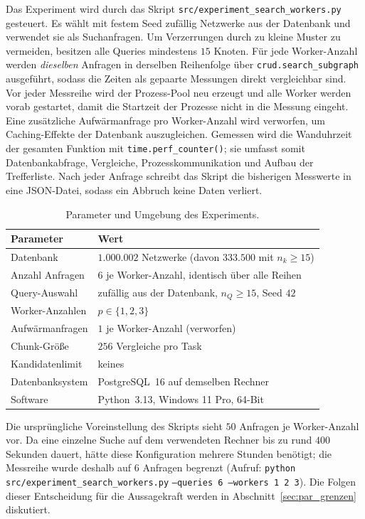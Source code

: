 \documentclass[a4paper,12pt, twoside]{report}
\theoremstyle{definition}
\begin{document}
Das Experiment wird durch das Skript \texttt{src/experiment\_search\_workers.py} gesteuert. Es wählt mit festem Seed zufällig Netzwerke aus der Datenbank und verwendet sie als Suchanfragen. Um Verzerrungen durch zu kleine Muster zu vermeiden, besitzen alle Queries mindestens $15$ Knoten. Für jede Worker-Anzahl werden \emph{dieselben} Anfragen in derselben Reihenfolge über \texttt{crud.search\_subgraph} ausgeführt, sodass die Zeiten als gepaarte Messungen direkt vergleichbar sind. Vor jeder Messreihe wird der Prozess-Pool neu erzeugt und alle Worker werden vorab gestartet, damit die Startzeit der Prozesse nicht in die Messung eingeht. Eine zusätzliche Aufwärmanfrage pro Worker-Anzahl wird verworfen, um Caching-Effekte der Datenbank auszugleichen. Gemessen wird die Wanduhrzeit der gesamten Funktion mit \texttt{time.perf\_counter()}; sie umfasst somit Datenbankabfrage, Vergleiche, Prozesskommunikation und Aufbau der Trefferliste. Nach jeder Anfrage schreibt das Skript die bisherigen Messwerte in eine JSON-Datei, sodass ein Abbruch keine Daten verliert.

\begin{table}[h]
	\centering
	\caption{Parameter und Umgebung des Experiments.}
	\label{tab:par_setup}
	\begin{tabular}{@{}ll@{}}
		\toprule
		Parameter & Wert \\
		\midrule
		Datenbank & $1.000.002$ Netzwerke (davon $333.500$ mit $n_k\ge 15$) \\
		Anzahl Anfragen & $6$ je Worker-Anzahl, identisch über alle Reihen \\
		Query-Auswahl & zufällig aus der Datenbank, $n_Q \ge 15$, Seed $42$ \\
		Worker-Anzahlen & $p\in\{1,2,3\}$ \\
		Aufwärmanfragen & $1$ je Worker-Anzahl (verworfen) \\
		Chunk-Größe & $256$ Vergleiche pro Task \\
		Kandidatenlimit & keines \\
		Datenbanksystem & PostgreSQL~16 auf demselben Rechner \\
		Software & Python~3.13, Windows 11 Pro, 64-Bit \\
		\bottomrule
	\end{tabular}
\end{table}

Die ursprüngliche Voreinstellung des Skripts sieht $50$ Anfragen je Worker-Anzahl vor. Da eine einzelne Suche auf dem verwendeten Rechner bis zu rund $400$ Sekunden dauert, hätte diese Konfiguration mehrere Stunden benötigt; die Messreihe wurde deshalb auf $6$ Anfragen begrenzt (Aufruf: \texttt{python src/experiment\_search\_workers.py} \linebreak \texttt{--queries 6 --workers 1 2 3}). Die Folgen dieser Entscheidung für die Aussagekraft werden in Abschnitt~\ref{sec:par_grenzen} diskutiert.
\end{document}
